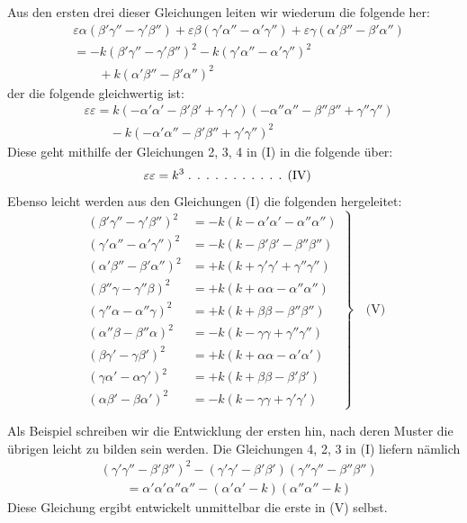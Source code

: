 Aus den ersten drei dieser Gleichungen leiten wir wiederum die folgende her:
\[
\begin{aligned}
&\varepsilon\alpha(\beta'\gamma''-\gamma'\beta'')+\varepsilon\beta(\gamma'\alpha''-\alpha'\gamma'')+\varepsilon\gamma(\alpha'\beta''-\beta'\alpha'')\\[6pt]
&=-k(\beta'\gamma''-\gamma'\beta'')^2-k(\gamma'\alpha''-\alpha'\gamma'')^2\\[6pt]
&\qquad{}+k(\alpha'\beta''-\beta'\alpha'')^2
\end{aligned}
\]
der die folgende gleichwertig ist:
\[
\begin{aligned}
&\varepsilon\varepsilon=k(-\alpha'\alpha'-\beta'\beta'+\gamma'\gamma')(-\alpha''\alpha''-\beta''\beta''+\gamma''\gamma'')\\[6pt]
&\qquad{}-k(-\alpha'\alpha''-\beta'\beta''+\gamma'\gamma'')^2
\end{aligned}
\]
Diese geht mithilfe der Gleichungen 2, 3, 4 in (I) in die folgende über:
\[
\begin{aligned}
&\varepsilon\varepsilon=k^3\;\ldotp\;\ldotp\;\ldotp\;\ldotp\;\ldotp\;\ldotp\;\ldotp\;\ldotp\;\ldotp\;\ldotp\;\ldotp\;\text{(IV)}
\end{aligned}
\]
Ebenso leicht werden aus den Gleichungen (I) die folgenden hergeleitet:
\[
\left.\begin{aligned}
(\beta'\gamma''-\gamma'\beta'')^2&=-k(k-\alpha'\alpha'-\alpha''\alpha'')\\[5pt]
(\gamma'\alpha''-\alpha'\gamma'')^2&=-k(k-\beta'\beta'-\beta''\beta'')\\[5pt]
(\alpha'\beta''-\beta'\alpha'')^2&=+k(k+\gamma'\gamma'+\gamma''\gamma'')\\[5pt]
(\beta''\gamma-\gamma''\beta)^2&=+k(k+\alpha\alpha-\alpha''\alpha'')\\[5pt]
(\gamma''\alpha-\alpha''\gamma)^2&=+k(k+\beta\beta-\beta''\beta'')\\[5pt]
(\alpha''\beta-\beta''\alpha)^2&=-k(k-\gamma\gamma+\gamma''\gamma'')\\[5pt]
(\beta\gamma'-\gamma\beta')^2&=+k(k+\alpha\alpha-\alpha'\alpha')\\[5pt]
(\gamma\alpha'-\alpha\gamma')^2&=+k(k+\beta\beta-\beta'\beta')\\[5pt]
(\alpha\beta'-\beta\alpha')^2&=-k(k-\gamma\gamma+\gamma'\gamma')
\end{aligned}\right\}\quad\text{(V)}
\]

Als Beispiel schreiben wir die Entwicklung der ersten hin, nach deren Muster die übrigen leicht zu bilden sein werden. Die Gleichungen 4, 2, 3 in (I) liefern nämlich
\[
\begin{aligned}
&(\gamma'\gamma''-\beta'\beta'')^2-(\gamma'\gamma'-\beta'\beta')(\gamma''\gamma''-\beta''\beta'')\\[6pt]
&\qquad{}=\alpha'\alpha'\alpha''\alpha''-(\alpha'\alpha'-k)(\alpha''\alpha''-k)
\end{aligned}
\]
Diese Gleichung ergibt entwickelt unmittelbar die erste in (V) selbst.

